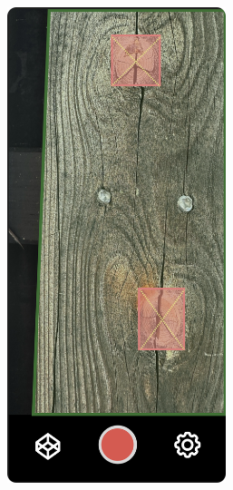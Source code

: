 \begin{figure}[ht]
\begin{subfigure}[b]{0.3\textwidth}
    \end{subfigure}
     \hfill
    \begin{subfigure}[b]{0.3\textwidth}
        \includegraphics[width=0.7\textwidth]{Master Thesis/Images/Section_3/Mock/3-Mock4.png}
    \end{subfigure}
     \hfill
    \begin{subfigure}[b]{0.3\textwidth}

\end{subfigure}
\end{figure}
